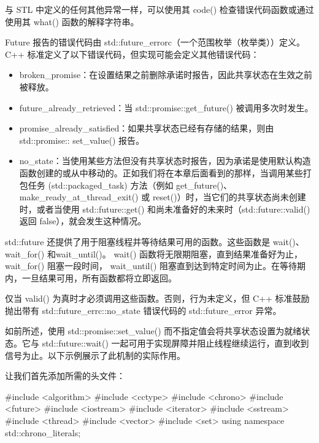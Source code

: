 与 STL 中定义的任何其他异常一样，可以使用其 code() 检查错误代码函数或通过使用其 what() 函数的解释字符串。

Future 报告的错误代码由 std::future\_errorc（一个范围枚举（枚举类））定义。 C++ 标准定义了以下错误代码，但实现可能会定义其他错误代码：

\begin{itemize}
\item
broken\_promise：在设置结果之前删除承诺时报告，因此共享状态在生效之前被释放。

\item
future\_already\_retrieved：当 std::promise::get\_future() 被调用多次时发生。

\item
promise\_already\_satisfied：如果共享状态已经有存储的结果，则由 std::promise:: set\_value() 报告。

\item
no\_state：当使用某些方法但没有共享状态时报告，因为承诺是使用默认构造函数创建的或从中移动的。正如我们将在本章后面看到的那样，当调用某些打包任务 (std::packaged\_task) 方法（例如 get\_future()、 make\_ready\_at\_thread\_exit() 或 reset()）时，当它们的共享状态尚未创建时，或者当使用 std::future::get() 和尚未准备好的未来时（std::future::valid() 返回 false），就会发生这种情况。
\end{itemize}


std::future 还提供了用于阻塞线程并等待结果可用的函数。这些函数是 wait()、 wait\_for() 和wait\_until()。 wait() 函数将无限期阻塞，直到结果准备好为止， wait\_for() 阻塞一段时间， wait\_until() 阻塞直到达到特定时间为止。在等待期内，一旦结果可用，所有函数都将立即返回。

仅当 valid() 为真时才必须调用这些函数。否则，行为未定义，但 C++ 标准鼓励抛出带有 std::future\_errc::no\_state 错误代码的 std::future\_error 异常。

如前所述，使用 std::promise::set\_value() 而不指定值会将共享状态设置为就绪状态。它与 std::future::wait() 一起可用于实现屏障并阻止线程继续运行，直到收到信号为止。以下示例展示了此机制的实际作用。

让我们首先添加所需的头文件：

\begin{cpp}
#include <algorithm>
#include <cctype>
#include <chrono>
#include <future>
#include <iostream>
#include <iterator>
#include <sstream>
#include <thread>
#include <vector>
#include <set>
using namespace std::chrono_literals;
\end{cpp}

